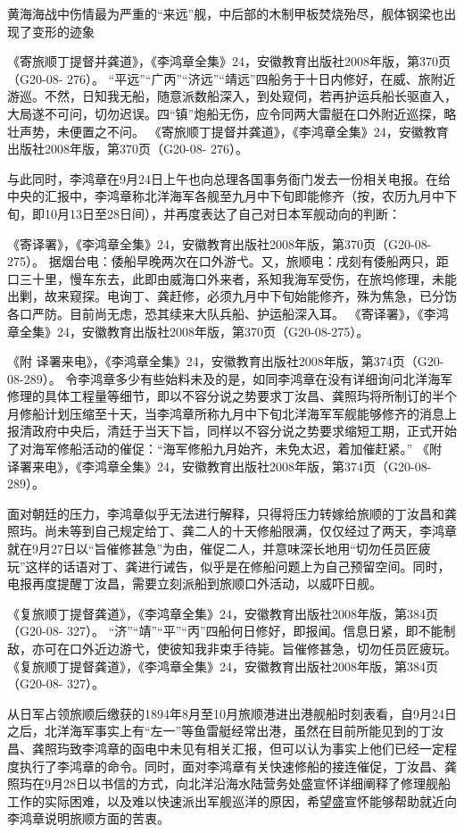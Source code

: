 \documentclass[12pt,UTF8]{ctexbook}
\begin{document}
黄海海战中伤情最为严重的“来远”舰，中后部的木制甲板焚烧殆尽，舰体钢梁也出现了变形的迹象

《寄旅顺丁提督并龚道》，《李鸿章全集》24，安徽教育出版社2008年版，第370页（G20-08- 276）。
“平远”“广丙”“济远”“靖远”四船务于十日内修好，在威、旅附近游巡。不然，日知我无船，随意派数船深入，到处窥伺，若再护运兵船长驱直入，大局遂不可问，切勿迟误。四“镇”炮船无伤，应令同两大雷艇在口外附近巡探，略壮声势，未便置之不问。 《寄旅顺丁提督并龚道》，《李鸿章全集》24，安徽教育出版社2008年版，第370页（G20-08- 276）。

与此同时，李鸿章在9月24日上午也向总理各国事务衙门发去一份相关电报。在给中央的汇报中，李鸿章称北洋海军各舰至九月中下旬即能修齐（按，农历九月中下旬，即10月13日至28日间），并再度表达了自己对日本军舰动向的判断：

《寄译署》，《李鸿章全集》24，安徽教育出版社2008年版，第370页（G20-08-275）。
据烟台电：倭船早晚两次在口外游弋。又，旅顺电：戌刻有倭船两只，距口三十里，慢车东去，此即由威海口外来者，系知我海军受伤，在旅坞修理，未能出剿，故来窥探。电询丁、龚赶修，必须九月中下旬始能修齐，殊为焦急，已分饬各口严防。目前尚无虑，恐其续来大队兵船、护运船深入耳。 《寄译署》，《李鸿章全集》24，安徽教育出版社2008年版，第370页（G20-08-275）。

《附 译署来电》，《李鸿章全集》24，安徽教育出版社2008年版，第374页（G20-08-289）。
令李鸿章多少有些始料未及的是，如同李鸿章在没有详细询问北洋海军修理的具体工程量等细节，即以不容分说之势要求丁汝昌、龚照玙将所制订的半个月修船计划压缩至十天，当李鸿章所称九月中下旬北洋海军军舰能够修齐的消息上报清政府中央后，清廷于当天下旨，同样以不容分说之势要求缩短工期，正式开始了对海军修船活动的催促：“海军修船九月始齐，未免太迟，着加催赶紧。” 《附 译署来电》，《李鸿章全集》24，安徽教育出版社2008年版，第374页（G20-08-289）。

面对朝廷的压力，李鸿章似乎无法进行解释，只得将压力转嫁给旅顺的丁汝昌和龚照玙。尚未等到自己规定给丁、龚二人的十天修船限满，仅仅经过了两天，李鸿章就在9月27日以“旨催修甚急”为由，催促二人，并意味深长地用“切勿任员匠疲玩”这样的话语对丁、龚进行诫告，似乎是在修船问题上为自己预留空间。同时，电报再度提醒丁汝昌，需要立刻派船到旅顺口外活动，以威吓日舰。

《复旅顺丁提督龚道》，《李鸿章全集》24，安徽教育出版社2008年版，第384页（G20-08- 327）。
“济”“靖”“平”“丙”四船何日修好，即报闻。信息日紧，即不能制敌，亦可在口外近边游弋，使彼知我非束手待毙。旨催修甚急，切勿任员匠疲玩。 《复旅顺丁提督龚道》，《李鸿章全集》24，安徽教育出版社2008年版，第384页（G20-08- 327）。

从日军占领旅顺后缴获的1894年8月至10月旅顺港进出港舰船时刻表看，自9月24日之后，北洋海军事实上有“左一”等鱼雷艇经常出港，虽然在目前所能见到的丁汝昌、龚照玙致李鸿章的函电中未见有相关汇报，但可以认为事实上他们已经一定程度执行了李鸿章的命令。同时，面对李鸿章有关快速修船的接连催促，丁汝昌、龚照玙在9月28日以书信的方式，向北洋沿海水陆营务处盛宣怀详细阐释了修理舰船工作的实际困难，以及难以快速派出军舰巡洋的原因，希望盛宣怀能够帮助就近向李鸿章说明旅顺方面的苦衷。
\end{document}
